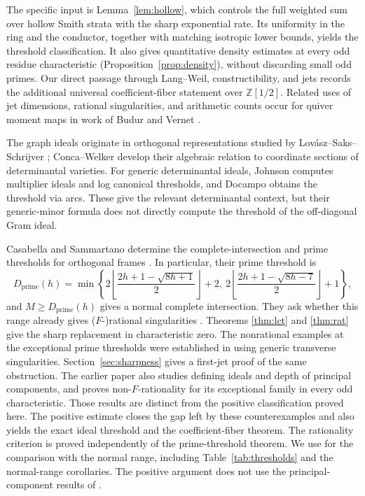 \documentclass[11pt]{article}
\numberwithin{equation}{section}
\theoremstyle{remark}
\newcommand{\Z}{\mathbb Z}
\newcommand{\Dprime}{D_{\mathrm{prime}}}
\begin{document}
The specific input is Lemma~\ref{lem:hollow}, which controls the full
weighted sum over hollow Smith strata with the sharp exponential rate.
Its uniformity in the ring and the conductor, together with matching
isotropic lower bounds, yields the threshold classification. It also
gives quantitative density estimates at every odd residue characteristic
(Proposition~\ref{prop:density}), without discarding small odd primes.
Our direct passage through Lang--Weil, constructibility, and jets records
the additional universal coefficient-fiber statement over $\Z[1/2]$.
Related uses of jet dimensions, rational singularities, and arithmetic
counts occur for quiver moment maps in work of Budur \cite{Budur} and
Vernet \cite{Vernet}.

The graph ideals originate in orthogonal representations studied by
Lov\'asz--Saks--Schrijver \cite{LSS}; Conca--Welker \cite{CW} develop their
algebraic relation to coordinate sections of determinantal varieties.
For generic determinantal ideals, Johnson \cite{Johnson} computes
multiplier ideals and log canonical thresholds, and Docampo
\cite[Theorem 5.6]{Docampo} obtains the threshold via arcs. These give
the relevant determinantal context, but their generic-minor formula
does not directly compute the threshold of the off-diagonal Gram ideal.

Casabella and Sammartano determine the complete-intersection and prime
thresholds for orthogonal frames \cite[Theorems 1--2]{CS}.
In particular, their prime threshold is
\begin{equation}\label{eq:Dprime}
\Dprime(h)=\min\left\{
2\left\lfloor\frac{2h+1-\sqrt{8h+1}}2\right\rfloor+2,\
2\left\lfloor\frac{2h+1-\sqrt{8h-7}}2\right\rfloor+1
\right\},
\end{equation}
and $M\ge\Dprime(h)$ gives a normal complete intersection.
They ask whether this range already gives ($F$-)rational singularities
\cite[Question 8.1]{CS}. Theorems \ref{thm:lct} and \ref{thm:rat}
give the sharp replacement in characteristic zero. The nonrational
examples at the exceptional prime thresholds were established in
\cite[Theorem 1.3 and Sections 6--7]{Xie} using generic transverse
singularities. Section~\ref{sec:sharpness} gives a first-jet proof of
the same obstruction. The earlier paper also studies defining ideals and
depth of principal components, and proves non-$F$-rationality for its
exceptional family in every odd characteristic. Those results are
distinct from the positive classification proved here. The positive
estimate closes the gap left
by these counterexamples and also yields the exact ideal threshold
and the coefficient-fiber theorem. The rationality criterion is
proved independently of the prime-threshold theorem. We use
\cite{CS} for the comparison with the normal range, including
Table~\ref{tab:thresholds} and the normal-range corollaries. The positive
argument does not use the principal-component results of \cite{Xie}.
\end{document}
